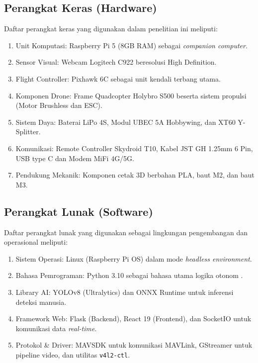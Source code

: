\subsection{Perangkat Keras (Hardware)}
Daftar perangkat keras yang digunakan dalam penelitian ini meliputi:
\begin{enumerate}
	\item Unit Komputasi: Raspberry Pi 5 (8GB RAM) sebagai \textit{companion computer}.
	\item Sensor Visual: Webcam Logitech C922 beresolusi High Definition.
	\item Flight Controller: Pixhawk 6C sebagai unit kendali terbang utama.
	\item Komponen Drone: Frame Quadcopter Holybro S500 beserta sistem propulsi (Motor Brushless dan ESC).
	\item Sistem Daya: Baterai LiPo 4S, Modul UBEC 5A Hobbywing, dan XT60 Y-Splitter.
	\item Komunikasi: Remote Controller Skydroid T10, Kabel JST GH 1.25mm 6 Pin, USB type C dan Modem MiFi 4G/5G.
	\item Pendukung Mekanik: Komponen cetak 3D berbahan PLA, baut M2, dan baut M3.
\end{enumerate}

\subsection{Perangkat Lunak (Software)}
Daftar perangkat lunak yang digunakan sebagai lingkungan pengembangan dan operasional meliputi:
\begin{enumerate}
	\item Sistem Operasi: Linux (Raspberry Pi OS) dalam mode \textit{headless environment}.
	\item Bahasa Pemrograman: Python 3.10 sebagai bahasa utama logika otonom \cite{Python2009}.
	\item Library AI: YOLOv8 (Ultralytics) dan ONNX Runtime untuk inferensi deteksi manusia.
	\item Framework Web: Flask (Backend), React 19 (Frontend), dan SocketIO untuk komunikasi data \textit{real-time}.
	\item Protokol \& Driver: MAVSDK untuk komunikasi MAVLink, GStreamer untuk pipeline video, dan utilitas \texttt{v4l2-ctl}.
\end{enumerate}

